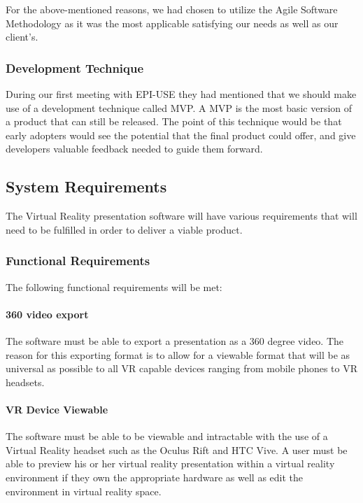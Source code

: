 For the above-mentioned reasons, we had chosen to utilize the Agile Software Methodology as it was the most applicable satisfying our needs as well as our client's.

	\subsubsection{Development Technique}
	During our first meeting with EPI-USE they had mentioned that we should make use of a development technique called MVP. A MVP is the most basic version of a product that can still be released. The point of this technique would be that early adopters would see the potential that the final product could offer, and give developers valuable feedback needed to guide them forward.

\subsection{System Requirements}

The Virtual Reality presentation software will have various requirements that will need to be fulfilled in order to deliver a viable product.

	\subsubsection{Functional Requirements}

	The following functional requirements will be met:

		\paragraph{360 video export}

		The software must be able to export a presentation as a 360 degree video.
		The reason for this exporting format is to allow for a viewable format that will be as universal as possible to all VR capable devices ranging from mobile phones to VR headsets.

		\paragraph{VR Device Viewable}

		The software must be able to be viewable and intractable with the use of a Virtual Reality headset such as the Oculus Rift and HTC Vive.
		A user must be able to preview his or her virtual reality presentation within a virtual reality environment if they own the appropriate hardware as well as edit the environment in virtual reality space.

